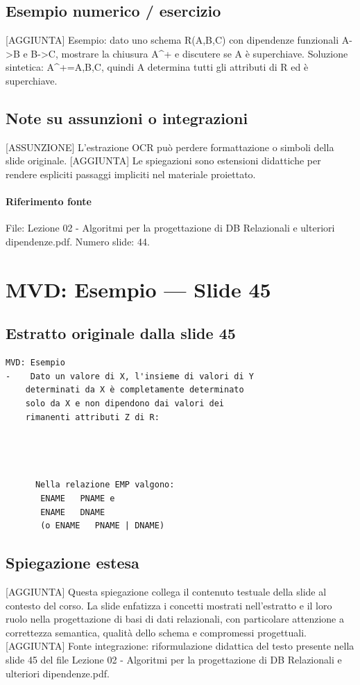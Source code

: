 \documentclass[11pt]{article}
\begin{document}
\subsection*{Esempio numerico / esercizio}
[AGGIUNTA] Esempio: dato uno schema R(A,B,C) con dipendenze funzionali A->B e B->C, mostrare la chiusura A^+ e discutere se A è superchiave. Soluzione sintetica: A^+={A,B,C}, quindi A determina tutti gli attributi di R ed è superchiave.
\subsection*{Note su assunzioni o integrazioni}
[ASSUNZIONE] L'estrazione OCR può perdere formattazione o simboli della slide originale.
[AGGIUNTA] Le spiegazioni sono estensioni didattiche per rendere espliciti passaggi impliciti nel materiale proiettato.
\paragraph{Riferimento fonte} File: Lezione 02 - Algoritmi per la progettazione di DB Relazionali e ulteriori dipendenze.pdf. Numero slide: 44.
\section{MVD: Esempio --- Slide 45}
\subsection*{Estratto originale dalla slide 45}
\begin{lstlisting}
MVD: Esempio
-    Dato un valore di X, l'insieme di valori di Y
    determinati da X è completamente determinato
    solo da X e non dipendono dai valori dei
    rimanenti attributi Z di R:




      Nella relazione EMP valgono:
       ENAME   PNAME e
       ENAME   DNAME
       (o ENAME   PNAME | DNAME)
\end{lstlisting}
\subsection*{Spiegazione estesa}
[AGGIUNTA] Questa spiegazione collega il contenuto testuale della slide al contesto del corso. La slide enfatizza i concetti mostrati nell'estratto e il loro ruolo nella progettazione di basi di dati relazionali, con particolare attenzione a correttezza semantica, qualità dello schema e compromessi progettuali.
[AGGIUNTA] Fonte integrazione: riformulazione didattica del testo presente nella slide 45 del file Lezione 02 - Algoritmi per la progettazione di DB Relazionali e ulteriori dipendenze.pdf.
\end{document}
